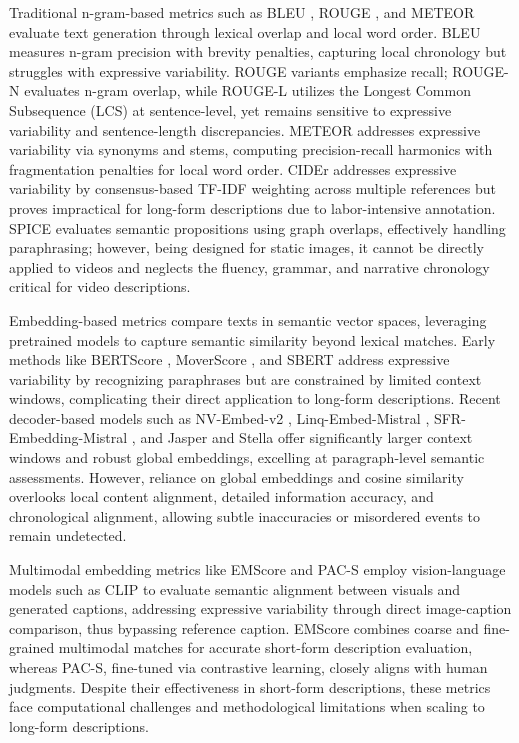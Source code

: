 \documentclass[letterpaper]{article} %
\begin{document}
Traditional n-gram-based metrics such as BLEU \citep{p:02}, ROUGE \citep{l:04}, and METEOR \citep{bl:05} evaluate text generation through lexical overlap and local word order. BLEU measures n-gram precision with brevity penalties, capturing local chronology but struggles with expressive variability. ROUGE variants emphasize recall; ROUGE-N evaluates n-gram overlap, while ROUGE-L utilizes the Longest Common Subsequence (LCS) at sentence-level, yet remains sensitive to expressive variability and sentence-length discrepancies. METEOR addresses expressive variability via synonyms and stems, computing precision-recall harmonics with fragmentation penalties for local word order. CIDEr \citep{v:15} addresses expressive variability by consensus-based TF-IDF weighting across multiple references but proves impractical for long-form descriptions due to labor-intensive annotation. SPICE \citep{afjg:16} evaluates semantic propositions using graph overlaps, effectively handling paraphrasing; however, being designed for static images, it cannot be directly applied to videos and neglects the fluency, grammar, and narrative chronology critical for video descriptions.

Embedding-based metrics compare texts in semantic vector spaces, leveraging pretrained models to capture semantic similarity beyond lexical matches. Early methods like BERTScore \citep{z:20}, MoverScore \citep{z:19}, and SBERT \citep{r:19} address expressive variability by recognizing paraphrases but are constrained by limited context windows, complicating their direct application to long-form descriptions. Recent decoder-based models such as NV-Embed-v2 \citep{l:24}, Linq-Embed-Mistral \citep{cklg:24}, SFR-Embedding-Mistral \citep{mljx:24}, and Jasper and Stella \citep{zlw:24} offer significantly larger context windows and robust global embeddings, excelling at paragraph-level semantic assessments. However, reliance on global embeddings and cosine similarity overlooks local content alignment, detailed information accuracy, and chronological alignment, allowing subtle inaccuracies or misordered events to remain undetected.

Multimodal embedding metrics like EMScore \citep{syxl:22} and PAC-S \citep{sbc:23} employ vision-language models such as CLIP \citep{Radford2021LearningTV} to evaluate semantic alignment between visuals and generated captions, addressing expressive variability through direct image-caption comparison, thus bypassing reference caption. EMScore combines coarse and fine-grained multimodal matches for accurate short-form description evaluation, whereas PAC-S, fine-tuned via contrastive learning, closely aligns with human judgments. Despite their effectiveness in short-form descriptions, these metrics face computational challenges and methodological limitations when scaling to long-form descriptions.
\end{document}
